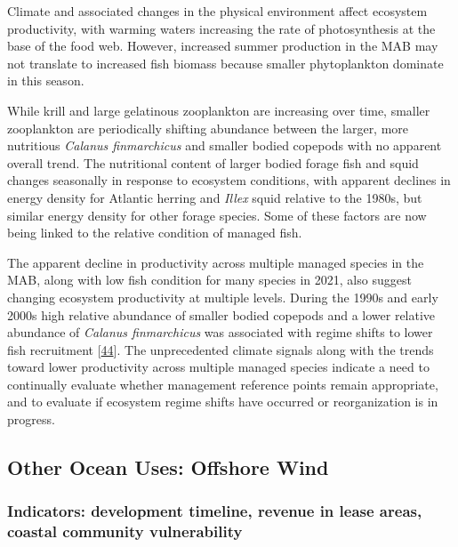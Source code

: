 \documentclass[
  10pt,
]{article}
\begin{document}
Climate and associated changes in the physical environment affect
ecosystem productivity, with warming waters increasing the rate of
photosynthesis at the base of the food web. However, increased summer
production in the MAB may not translate to increased fish biomass
because smaller phytoplankton dominate in this season.

While krill and large gelatinous zooplankton are increasing over time,
smaller zooplankton are periodically shifting abundance between the
larger, more nutritious \emph{Calanus finmarchicus} and smaller bodied
copepods with no apparent overall trend. The nutritional content of
larger bodied forage fish and squid changes seasonally in response to
ecosystem conditions, with apparent declines in energy density for
Atlantic herring and \emph{Illex} squid relative to the 1980s, but
similar energy density for other forage species. Some of these factors
are now being linked to the relative condition of managed fish.

The apparent decline in productivity across multiple managed species in
the MAB, along with low fish condition for many species in 2021, also
suggest changing ecosystem productivity at multiple levels. During the
1990s and early 2000s high relative abundance of smaller bodied copepods
and a lower relative abundance of \emph{Calanus finmarchicus} was
associated with regime shifts to lower fish recruitment
{[}\protect\hyperlink{ref-perretti_regime_2017}{44}{]}. The
unprecedented climate signals along with the trends toward lower
productivity across multiple managed species indicate a need to
continually evaluate whether management reference points remain
appropriate, and to evaluate if ecosystem regime shifts have occurred or
reorganization is in progress.

\hypertarget{other-ocean-uses-offshore-wind}{%
\subsection{Other Ocean Uses: Offshore
Wind}\label{other-ocean-uses-offshore-wind}}

\hypertarget{indicators-development-timeline-revenue-in-lease-areas-coastal-community-vulnerability}{%
\subsubsection{Indicators: development timeline, revenue in lease areas,
coastal community
vulnerability}\label{indicators-development-timeline-revenue-in-lease-areas-coastal-community-vulnerability}}
\end{document}
